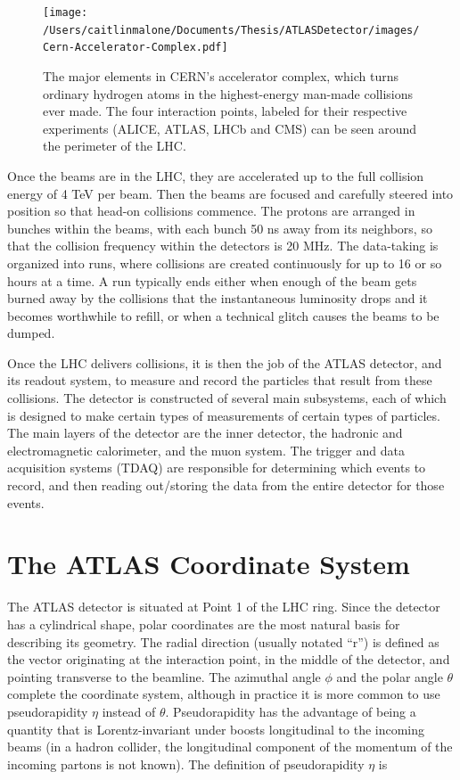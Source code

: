 \begin{figure}
	\centering
	\texttt{[image: /Users/caitlinmalone/Documents/Thesis/ATLASDetector/images/Cern-Accelerator-Complex.pdf]}
	\caption{ The major elements in CERN's accelerator complex, which turns ordinary hydrogen atoms in the highest-energy man-made collisions ever made. The four interaction points, labeled for their respective experiments (ALICE, ATLAS, LHCb and CMS) can be seen around the perimeter of the LHC. \label{fig:accelerator_complex}}
\end{figure}



Once the beams are in the LHC, they are accelerated up to the full collision energy of 4 TeV per beam.  Then the beams are focused  and carefully steered into position so that head-on collisions commence.  The protons are arranged in bunches within the beams, with each bunch 50 ns away from its neighbors, so that the collision frequency within the detectors is 20 MHz.  The data-taking is organized into runs, where collisions are created continuously for up to 16 or so hours at a time.  A run typically ends either when enough of the beam gets burned away by the collisions that the instantaneous luminosity drops and it becomes worthwhile to refill, or when a technical glitch causes the beams to be dumped.



Once the LHC delivers collisions, it is then the job of the ATLAS detector, and its readout system, to measure and record the particles that result from these collisions.  The detector is constructed of several main subsystems, each of which is designed to make certain types of measurements of certain types of particles.  The main layers of the detector are the inner detector, the hadronic and electromagnetic calorimeter, and the muon system.  The trigger and data acquisition systems (TDAQ) are responsible for determining which events to record, and then reading out/storing the data from the entire detector for those events.


\section{The ATLAS Coordinate System}
The ATLAS detector is situated at Point 1 of the LHC ring.  Since the detector has a cylindrical shape, polar coordinates are the most natural basis for describing its geometry.  The radial direction (usually notated ``r'') is defined as the vector originating at the interaction point, in the middle of the detector, and pointing transverse to the beamline.  The azimuthal angle $\phi$ and the polar angle $\theta$ complete the coordinate system, although in practice it is more common to use pseudorapidity $\eta$ instead of $\theta$.  Pseudorapidity has the advantage of being a quantity that is Lorentz-invariant under boosts longitudinal to the incoming beams (in a hadron collider, the longitudinal component of the momentum of the incoming partons is not known).  The definition of pseudorapidity $\eta$ is

